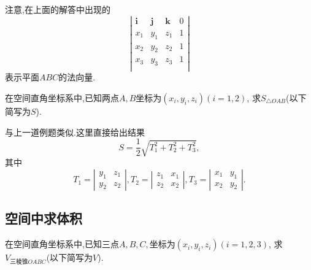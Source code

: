 注意,在上面的解答中出现的
$$
\left|
  \begin{array}{cccc}
    \bm{i}&\bm{j}&\bm{k}&0\\
    x_1&y_1&z_1&1\\
    x_2&y_2 &z_2&1\\
    x_3&y_3&z_3&1\\
  \end{array}
  \right|
$$
表示平面$ABC$的法向量.

\prob 在空间直角坐标系中,已知两点$A,B
\textrm{坐标为}(x_i,y_i,z_i)(i=1,2)$,
求$S_{\triangle OAB}$(以下简写为$S$).

\sol 与上一道例题类似.这里直接给出结果
$$S=\frac{1}{2}\sqrt{T_1^2+T_2^2+T_3^2},$$
其中
$$
T_1=\left|\begin{array}{cc}
  y_1&z_1\\
  y_2&z_2
  \end{array}\right|
  ,
T_2=\left|\begin{array}{cc}
  z_1&x_1\\
  z_2&x_2
  \end{array}\right|
  ,
T_3=\left|\begin{array}{cc}
  x_1&y_1\\
  x_2&y_2
  \end{array}\right|
  .
$$ 
\solend

\subsection{空间中求体积}

\prob 在空间直角坐标系中,已知三点$A,B,C,
\textrm{坐标为}(x_i,y_i,z_i)(i=1,2,3)$,
求$V_{\textrm{三棱锥}OABC}$(以下简写为$V$).

